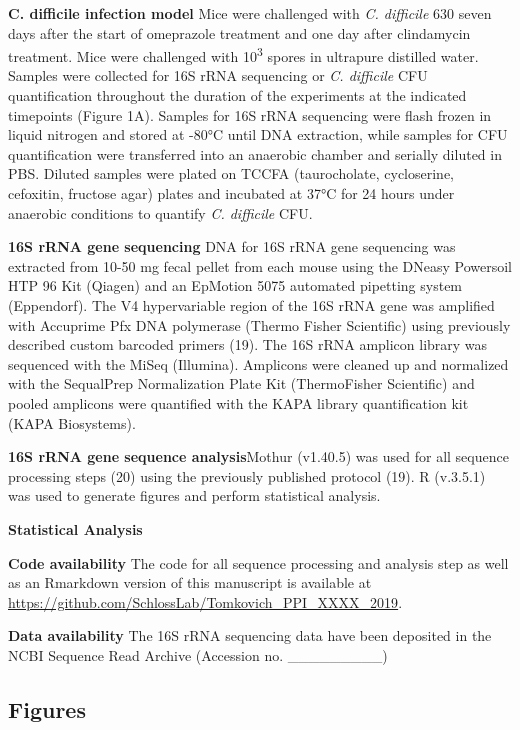 \documentclass[11pt,]{article}
\begin{document}
\textbf{C. difficile infection model} Mice were challenged with \emph{C.
difficile} 630 seven days after the start of omeprazole treatment and
one day after clindamycin treatment. Mice were challenged with
10\textsuperscript{3} spores in ultrapure distilled water. Samples were
collected for 16S rRNA sequencing or \emph{C. difficile} CFU
quantification throughout the duration of the experiments at the
indicated timepoints (Figure 1A). Samples for 16S rRNA sequencing were
flash frozen in liquid nitrogen and stored at -80°C until DNA
extraction, while samples for CFU quantification were transferred into
an anaerobic chamber and serially diluted in PBS. Diluted samples were
plated on TCCFA (taurocholate, cycloserine, cefoxitin, fructose agar)
plates and incubated at 37°C for 24 hours under anaerobic conditions to
quantify \emph{C. difficile} CFU.

\textbf{16S rRNA gene sequencing} DNA for 16S rRNA gene sequencing was
extracted from 10-50 mg fecal pellet from each mouse using the DNeasy
Powersoil HTP 96 Kit (Qiagen) and an EpMotion 5075 automated pipetting
system (Eppendorf). The V4 hypervariable region of the 16S rRNA gene was
amplified with Accuprime Pfx DNA polymerase (Thermo Fisher Scientific)
using previously described custom barcoded primers (19). The 16S rRNA
amplicon library was sequenced with the MiSeq (Illumina). Amplicons were
cleaned up and normalized with the SequalPrep Normalization Plate Kit
(ThermoFisher Scientific) and pooled amplicons were quantified with the
KAPA library quantification kit (KAPA Biosystems).

\textbf{16S rRNA gene sequence analysis}Mothur (v1.40.5) was used for
all sequence processing steps (20) using the previously published
protocol (19). R (v.3.5.1) was used to generate figures and perform
statistical analysis.

\textbf{Statistical Analysis}

\textbf{Code availability} The code for all sequence processing and
analysis step as well as an Rmarkdown version of this manuscript is
available at
\url{https://github.com/SchlossLab/Tomkovich_PPI_XXXX_2019}.

\textbf{Data availability} The 16S rRNA sequencing data have been
deposited in the NCBI Sequence Read Archive (Accession no.
\_\_\_\_\_\_\_\_\_)

\newpage

\subsection{Figures}\label{figures}
\end{document}
